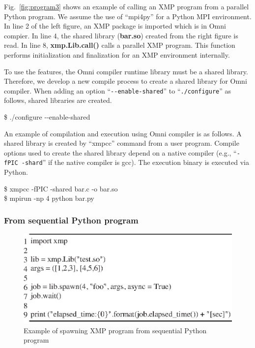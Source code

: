 \documentclass[graybox]{svmult}
\begin{document}
Fig.~\ref{fig:program3} shows an example of calling an XMP program from a parallel Python program.
We assume the use of ``mpi4py'' for a Python MPI environment.
In line 2 of the left figure, an XMP package is imported which is in Omni compier.
In line 4, the shared library ({\bf bar.so}) created from the right figure is read.
In line 8, {\bf xmp.Lib.call()} calls a parallel XMP program.
This function performs initialization and finalization for an XMP environment internally.

To use the features, the Omni compiler runtime library must be a shared library. 
Therefore, we develop a new compile process to create a shared library for Omni compiler. 
When adding an option ``{\tt {-}{-}enable-shared}'' to ``{\tt ./configure}'' as follows, shared libraries are created.

\begin{svgraybox}
\$ ./configure {-}{-}enable-shared
\end{svgraybox}

An example of compilation and execution using Omni compiler is as follows. 
A shared library is created by ``xmpcc'' command from a user program. 
Compile options used to create the shared library depend on a native compiler (e.g., ``{\tt -fPIC -shard}'' if the native compiler is gcc). 
The execution binary is executed via Python.

\begin{svgraybox}
\$ xmpcc -fPIC -shared bar.c -o bar.so\\
\$ mpirun -np 4 python bar.py
\end{svgraybox}

\subsubsection{From sequential Python program}
\begin{figure}[h]
\sidecaption
\includegraphics[scale=.82]{img/program6.eps}
\caption{Example of spawning XMP program from sequential Python program\cite{pgas-ei}} \label{fig:program6}
\end{figure}
\end{document}
